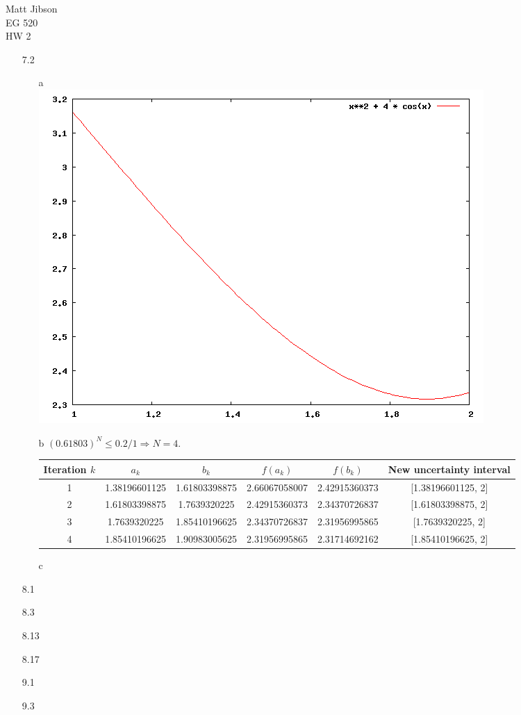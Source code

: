 \documentclass{article}
\begin{document}
\begin{flushright}
Matt Jibson \\
EG 520 \\
HW 2
\end{flushright}

\begin{itemize}
	\item[7.2]
		\begin{itemize}
			\item[a] \ \\ \includegraphics[width=0.5\linewidth]{72a.png}
			\item[b] $(0.61803)^N \le 0.2/1 \Rightarrow N = 4$. \\
				\begin{tabular}{cccccc}
					\hline
					Iteration $k$ & $a_k$ & $b_k$ & $f(a_k)$ & $f(b_k)$ & New uncertainty interval \\
					\hline
					1 & 1.38196601125 & 1.61803398875 & 2.66067058007 & 2.42915360373 & [1.38196601125, 2] \\
					2 & 1.61803398875 & 1.7639320225 & 2.42915360373 & 2.34370726837 & [1.61803398875, 2] \\
					3 & 1.7639320225 & 1.85410196625 & 2.34370726837 & 2.31956995865 & [1.7639320225, 2] \\
					4 & 1.85410196625 & 1.90983005625 & 2.31956995865 & 2.31714692162 & [1.85410196625, 2] \\
					\hline
				\end{tabular}
			\item[c]
		\end{itemize}
	\item[8.1]
	\item[8.3]
	\item[8.13]
	\item[8.17]
	\item[9.1]
	\item[9.3]
\end{itemize}
\end{document}
